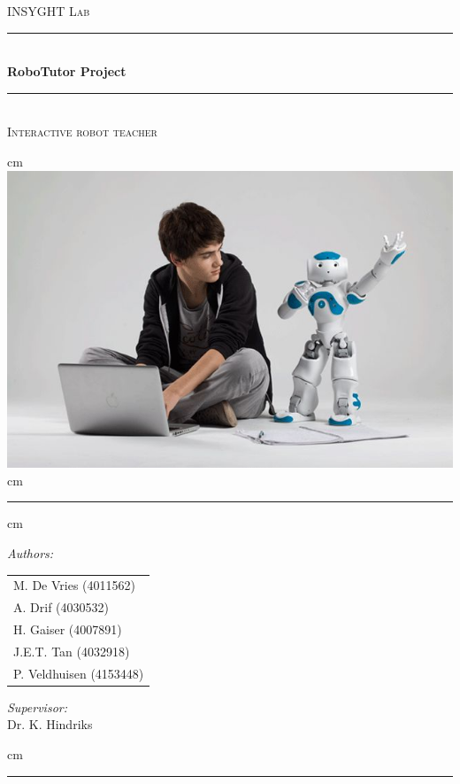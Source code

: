 \documentclass[a4paper,10pt]{report}
\begin{document}
\begin{titlepage}
			\begin{center}
			\textsc{\LARGE {INSYGHT Lab}}\\[1cm]
			\rule{\linewidth}{0.5mm} \\[0.4cm]

			{\Huge \bfseries RoboTutor Project}\\[0.15cm]

			\rule{\linewidth}{0.5mm} \\
			\textsc{\large{Interactive robot teacher}}
			
			 cm
			\includegraphics[scale=1.5]{nao02.jpg}
			 cm
			\rule{\linewidth}{0.5mm}
			
			 cm
			
			\begin{minipage}{0.4\textwidth}
				\begin{flushleft} \large
					\emph{Authors:}\\
					\begin{tabular}{l}
						M. De Vries (4011562) \\
						A. Drif (4030532) \\
						H. Gaiser (4007891) \\
						J.E.T. Tan (4032918)\\
						P. Veldhuisen (4153448)\\
					\end{tabular}
				\end{flushleft}
			\end{minipage}
			\hspace{1cm}
			\begin{minipage}{0.4\textwidth}
				\begin{flushright} \large
					\emph{Supervisor:} \\
					Dr. K. Hindriks
				\end{flushright}
			\end{minipage}
			
			 cm
			
			\rule{\linewidth}{0.5mm}
			\end{center}
\end{titlepage}
\setcounter{secnumdepth}{0}
\tableofcontents
\end{document}
